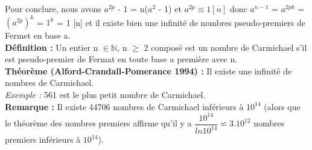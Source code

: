 \documentclass[12pt,a4paper]{article}
\begin{document}
Pour conclure, nous avons $a^{2p}$ - 1 = n($a^2$ - 1) et $a^{2p} \equiv 1[n]$ donc $a^{n-1}$ = $a^{2pk}$ = $(a^{2p})^k$ = $1^k$ = 1 [n] et il existe bien une infinité de nombres pseudo-premiers de Fermet en base a.\\
\textbf{Définition :} Un entier n $\in \mathbb{N}$, n $\geq$ 2 composé est un nombre de Carmichael s'il est pseudo-premier de Fermat en toute base a première avec n.\\
\textbf{Théorème (Alford-Crandall-Pomerance 1994) :} Il existe une infinité de nombres de Carmichael.\\
\textit{Exemple :} 561 est le plus petit nombre de Carmichael.\\
\textbf{Remarque :} Il existe 44706 nombres de Carmichael inférieurs à $10^{14}$ (alors que le théorème des nombres premiers affirme qu'il y a $\dfrac{10^{14}}{ln10^{14}} \backsimeq 3.10^{12}$ nombres premiers inférieurs à $10^{14}$).
\end{document}
